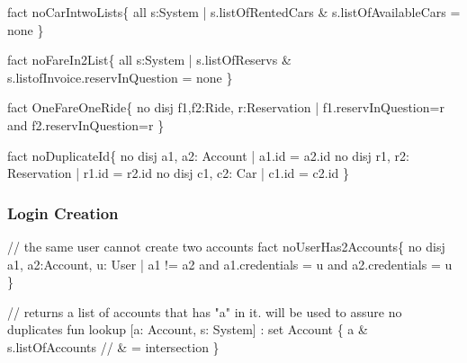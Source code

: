 \documentclass[a4paper]{article}
\begin{document}
fact noCarIntwoLists\{ \newline 
\hspace*{5 mm}	all s:System | \newline
\hspace*{5 mm}	s.listOfRentedCars \& s.listOfAvailableCars = none \newline
\} \newline

fact noFareIn2List\{ \newline
\hspace*{5 mm}	all s:System | \newline 
\hspace*{5 mm}	s.listOfReservs \& s.listofInvoice.reservInQuestion = none \newline	
\} \newline

fact OneFareOneRide\{\newline
\hspace*{5 mm}	no disj f1,f2:Ride, r:Reservation |  f1.reservInQuestion=r and  f2.reservInQuestion=r \newline
\} \newline

fact noDuplicateId\{ \newline
\hspace*{5 mm}	no disj a1, a2: Account | a1.id = a2.id \newline
\hspace*{5 mm}	no disj r1, r2: Reservation | r1.id = r2.id \newline
\hspace*{5 mm}	no disj c1, c2: Car | c1.id = c2.id \newline
\} \newline
\subsubsection{Login Creation}

// the same user cannot create two accounts  \newline
fact noUserHas2Accounts\{  \newline 
\hspace*{5 mm}	no disj a1, a2:Account, u: User | a1 != a2 and a1.credentials = u \hspace*{5 mm} and a2.credentials = u  \newline
\}  \newline

// returns a list of accounts that has "a" in it. will be used to assure no duplicates  \newline
fun lookup [a: Account, s: System] : set Account \{  \newline
\hspace*{5 mm}	a \& s.listOfAccounts // \& = intersection  \newline
\} \newline
\end{document}
